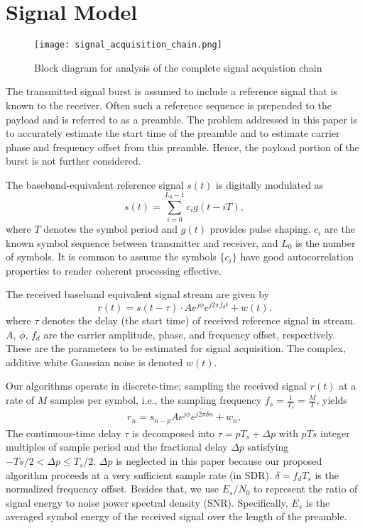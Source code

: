 \section{Signal Model}
\label{sec:model}

\begin{figure*}[t]
  \centerline{\texttt{[image: signal\_acquisition\_chain.png]}}
  \caption{Block diagram for analysis of the complete signal acquistion chain}
  \label{fig:sig_acquis_chain}
  \end{figure*}

The transmitted signal burst is assumed to include a refere\-nce signal that is known to the receiver.
Often such a reference sequence is prepended to the payload and is referred to as a preamble.
The problem addressed in this paper is to accurately estimate the start time of the preamble and 
to estimate carrier phase and frequency offset from this preamble.
Hence, the payload portion of the burst is not further considered.

The baseband-equivalent reference signal $s(t)$ is digitally modulated as
\begin{equation}
    \label{eq:l_ref_sig_analog}
    s(t) = \sum_{i=0}^{L_0-1} c_i g(t-iT),
  \end{equation}
where $T$ denotes the symbol period and $g(t)$ provides pulse shaping. $c_i$ are the known symbol sequence
between transmitter and receiver, and $L_0$ is the number of symbols. It is common to assume the symbols 
$\{c_i\}$ have good autocorrelation properties to render coherent processing effective.

The received baseband equivalent signal stream are given by
\begin{equation}
    \label{eq:rec_sig_analog}
    r(t) = s(t-\tau) \cdot Ae^{j \phi} e^{j2\pi f_d t} + w(t).
  \end{equation}
where $\tau$ denotes the delay (the start time) of received reference signal in stream. $A$, $\phi$, $f_d$ 
are the carrier amplitude, phase, and frequency offset, respectively. These are the parameters to be estimated
for signal acquisition. The complex, additive white Gaussian noise is denoted $w(t)$.

Our algorithms operate in discrete-time; sampling the received signal $r(t)$ at a rate of $M$ samples per symbol,
i.e., the sampling frequency $f_s=\frac{1}{T_s}=\frac{M}{T}$, yields 
\begin{equation}
    \begin{aligned}
      \label{eq:model}
      r_n = s_{n-p}Ae^{j\phi}e^{j2\pi\delta n}+w_{n},
    \end{aligned}
  \end{equation}
The continuous-time delay $\tau$ is decomposed into $\tau=pT_s+\Delta p$ with $pTs$ integer multiples of sample period and 
the fractional delay $\Delta p$ satisfying $-Ts/2 < \Delta p \leq T_s/2$. $\Delta p$ is neglected in this paper because 
our proposed algorithm proceeds at a very sufficient sample rate (in SDR). $\delta=f_d T_s$ is the normalized frequency offset. 
Besides that, we use $E_s/N_0$ to represent the ratio of signal energy to noise power spectral density (SNR).
Specifically, $E_s$ is the averaged symbol energy of the received signal over the length of the preamble.


